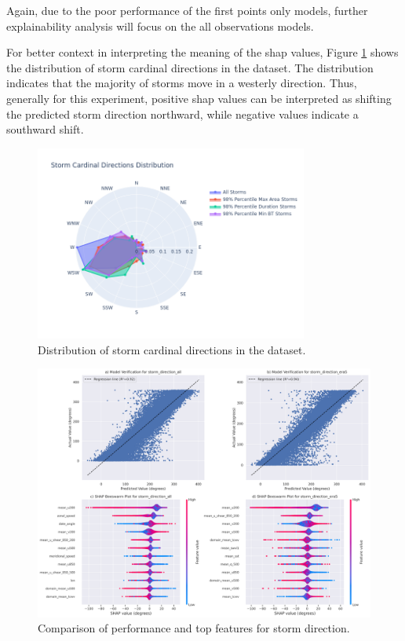 Again, due to the poor performance of the first points only models, further explainability analysis will focus on the all observations models.

For better context in interpreting the meaning of the \acrshort{shap} values, Figure \ref{fig:storm_cardinal_directions_distribution} shows the distribution of storm cardinal directions in the dataset. The distribution indicates that the majority of storms move in a westerly direction. Thus, generally for this experiment, positive \acrshort{shap} values can be interpreted as shifting the predicted storm direction northward, while negative values indicate a southward shift.

\begin{figure}[h]
    \centering
    \includegraphics[width=0.8\textwidth]{../figures/generated/exploration/storm_cardinal_directions_distribution.png}
    \caption{Distribution of storm cardinal directions in the dataset.}
    \label{fig:storm_cardinal_directions_distribution}
\end{figure}

\begin{figure}[h]
    \centering
    \includegraphics[width=\textwidth]{../figures/generated/experiments/storm_direction/storm_direction_summary.png}
    \caption{Comparison of performance and top features for storm direction.}
    \label{fig:storm_direction_summary}
\end{figure}

